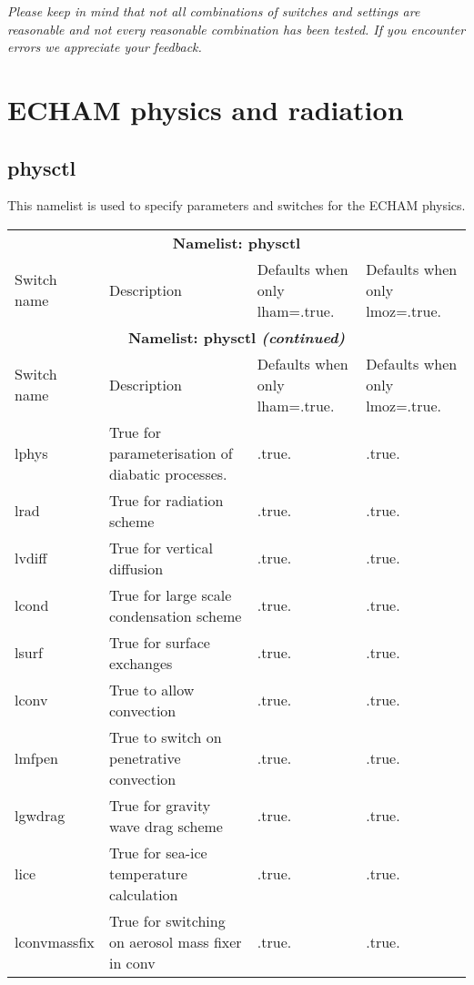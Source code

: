 \documentclass[landscape, 11pt]{article}
\begin{document}
{\it Please keep in mind that not all combinations of switches and settings are reasonable and not every reasonable combination has been tested. If you encounter errors we appreciate your feedback.}\\

\newpage
\section{ECHAM physics and radiation}
\subsection{physctl} 
This namelist is used to specify parameters and switches for the ECHAM physics.\\

\begin{longtable}{p{3.0cm}|p{7.5cm}|p{6.0cm}|p{6.0cm}}
\hline 
\multicolumn{4}{c}{\cellcolor{blue1} \bf Namelist: physctl}\\ 
\cellcolor{blue2} Switch name & \cellcolor{blue2} Description& \cellcolor{blue2} Defaults when only lham=.true.& \cellcolor{blue2} Defaults when only lmoz=.true.\\ 
\hline \endfirsthead 
\multicolumn{4}{c}{\cellcolor{blue1} \bf Namelist: physctl {\it (continued)}}\\ 
\cellcolor{blue2} Switch name & \cellcolor{blue2} Description& \cellcolor{blue2} Defaults when only lham=.true.& \cellcolor{blue2} Defaults when only lmoz=.true.\\ 
\hline \endhead 
lphys & True for parameterisation of diabatic processes. & .true. & .true. \\ 
lrad & True for radiation scheme & .true. & .true. \\ 
lvdiff & True for vertical diffusion & .true. & .true. \\ 
lcond & True for large scale condensation scheme & .true. & .true. \\ 
lsurf & True for surface exchanges & .true. & .true. \\ 
lconv & True to allow convection & .true. & .true. \\ 
lmfpen & True to switch on penetrative convection & .true. & .true. \\ 
lgwdrag & True for gravity wave drag scheme & .true. & .true. \\ 
lice & True for sea-ice temperature calculation & .true. & .true. \\ 
lconvmassfix & True for switching on aerosol mass fixer in conv & .true. & .true. \\ 

\end{longtable}
\end{document}
